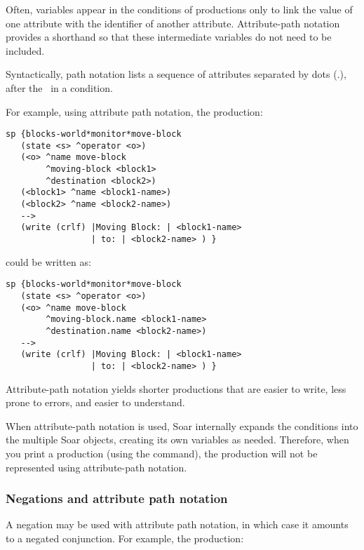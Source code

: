 Often, variables appear in the conditions of productions only to link the value of one attribute with the identifier of another attribute. Attribute-path notation provides a shorthand so that these intermediate variables do not need to be included.

Syntactically, path notation lists a sequence of attributes separated by dots (.), after the \carat \ in a condition.

For example, using attribute path notation, the production:

\begin{verbatim}
sp {blocks-world*monitor*move-block
   (state <s> ^operator <o>)
   (<o> ^name move-block
        ^moving-block <block1>
        ^destination <block2>)
   (<block1> ^name <block1-name>)
   (<block2> ^name <block2-name>)   
   -->
   (write (crlf) |Moving Block: | <block1-name>
                 | to: | <block2-name> ) }
\end{verbatim}

could be written as:

\begin{verbatim}
sp {blocks-world*monitor*move-block
   (state <s> ^operator <o>)
   (<o> ^name move-block
        ^moving-block.name <block1-name>
        ^destination.name <block2-name>)   
   -->
   (write (crlf) |Moving Block: | <block1-name>
                 | to: | <block2-name> ) }
\end{verbatim}

Attribute-path notation yields shorter productions that are easier to write, less prone to errors, and easier to understand.

When attribute-path notation is used, Soar internally expands the conditions into the multiple Soar objects, creating its own variables as needed. Therefore, when you print a production (using the  command), the production will not be represented using attribute-path notation.


\subsubsection*{Negations and attribute path notation}


A negation may be used with attribute path notation, in which case it amounts
to a negated conjunction. For example, the production:

